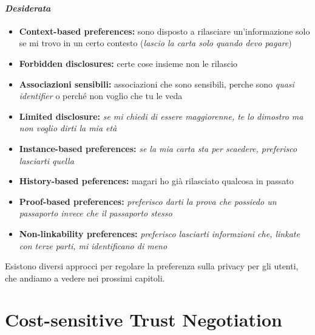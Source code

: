 \documentclass{report}
\begin{document}
\subsubsection{\textit{Desiderata}}
\begin{itemize}
    \item \textbf{Context-based preferences:} sono disposto a rilasciare un'informazione solo se mi trovo in un certo contesto (\textit{lascio la carta solo quando devo pagare})
    \item \textbf{Forbidden disclosures:} certe cose insieme non le rilascio
    \item \textbf{Associazioni sensibili:} associazioni che sono sensibili, perche sono \textit{quasi identifier} o perché non voglio che tu le veda
    \item \textbf{Limited disclosure:} \textit{se mi chiedi di essere maggiorenne, te lo dimostro ma non voglio dirti la mia età}
    \item \textbf{Instance-based preferences:} \textit{se la mia carta sta per scaedere, preferisco lasciarti quella}
    \item \textbf{History-based peferences:} magari ho già rilasciato qualcosa in passato
    \item \textbf{Proof-based preferences:} \textit{preferisco darti la prova che possiedo un passaporto invece che il passaporto stesso}
    \item \textbf{Non-linkability preferences:} \textit{preferisco lasciarti informzioni che, linkate con terze parti, mi identificano di meno}
\end{itemize}

\noindent Esistono diversi approcci per regolare la preferenza sulla privacy per gli utenti, 
che andiamo a vedere nei prossimi capitoli.

\chapter{Cost-sensitive Trust Negotiation}
\end{document}
